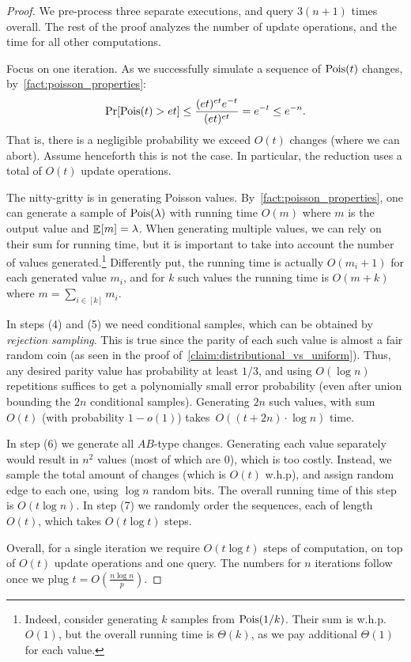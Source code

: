 \documentclass[letter,11pt]{article}
\begin{document}
\begin{proof}
    We pre-process three separate executions, and query $3(n+1)$ times overall. 
    The rest of the proof analyzes the number of update operations, and the time for all other computations.

    Focus on one iteration.
    As we successfully simulate a sequence of $\poisson{t}$ changes, by~\cref{fact:poisson_properties}:
    \[
        \Prob{}{\poisson{t} > e t}
        \leq \frac{(e t)^{e t} e^{-t}}{(e t)^{e t}}
        = e^{-t} 
        \leq e^{-n} .
    \]
    That is, there is a negligible probability we exceed $O(t)$ changes (where we can abort). Assume henceforth this is not the case. 
    In particular, the reduction uses a total of $O(t)$ update operations.

    The nitty-gritty is in generating Poisson values. By~\cref{fact:poisson_properties}, one can generate a sample of $\poisson{\lambda}$ with running time $O(m)$ where $m$ is the output value and $\Expc{}{m} = \lambda$. When generating multiple values, we can rely on their sum for running time, but it is important to take into account the number of values generated.\footnote{Indeed, consider generating $k$ samples from $\poisson{1/k}$. Their sum is w.h.p. $O(1)$, but the overall running time is $\Theta(k)$, as we pay additional $\Theta(1)$ for each value.}
    Differently put, the running time is actually $O(m_i+1)$ for each generated value $m_i$, and for $k$ such values the running time is $O(m+k)$ where $m = \sum_{i\in[k]} m_i$.
    
   
    In steps (4) and (5) we need conditional samples, which can be obtained by \emph{rejection sampling}.
    This is true since the parity of each such value is almost a fair random coin (as seen in the proof of~\cref{claim:distributional_vs_uniform}). Thus, any desired parity value has probability at least $1/3$, and using $O(\log n)$ repetitions suffices to get a polynomially small error probability (even after union bounding the $2n$ conditional samples).
    Generating $2n$ such values, with sum $O(t)$ (with probability $1-o(1)$) takes~$O\left((t + 2n)\cdot \log n\right)$ time.

    In step (6) we generate all $AB$-type changes. Generating each value separately would result in $n^2$ values (most of which are $0$), which is too costly.
    Instead, we sample the total amount of changes (which is $O(t)$ w.h.p), and assign random edge to each one, using $\log n$ random bits. The overall running time of this step is $O\left(t \log n\right)$. 
    In step (7) we randomly order the sequences, each of length $O(t)$, which takes $O(t \log t)$ steps.

    Overall, for a single iteration we require $O(t \log t)$ steps of computation, on top of $O(t)$ update operations and one query. The numbers for $n$ iterations follow once we plug $t = O\left(\frac{n \log n}{p}\right)$.
\end{proof}
\end{document}
